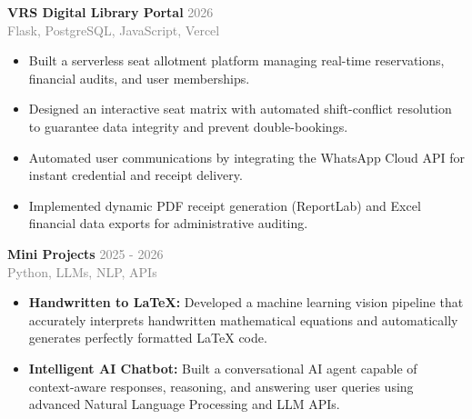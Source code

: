 \documentclass[a4paper,10pt]{article}
\begin{document}
\begin{minipage}[t]{12.2cm}
    \textbf{VRS Digital Library Portal} \hfill \textcolor{GrayText}{2026}\\
    \textcolor{GrayText}{Flask, PostgreSQL, JavaScript, Vercel}\\
    \begin{itemize}[leftmargin=*, noitemsep, topsep=0pt, label={\color{DarkText}\textbullet}]
        \color{LightText}\small
        \item Built a serverless seat allotment platform managing real-time reservations, financial audits, and user memberships.
        \item Designed an interactive seat matrix with automated shift-conflict resolution to guarantee data integrity and prevent double-bookings.
        \item Automated user communications by integrating the WhatsApp Cloud API for instant credential and receipt delivery.
        \item Implemented dynamic PDF receipt generation (ReportLab) and Excel financial data exports for administrative auditing. 
    \end{itemize}
    \vspace{0.3cm}

    \textbf{Mini Projects} \hfill \textcolor{GrayText}{2025 - 2026}\\
    \textcolor{GrayText}{Python, LLMs, NLP, APIs}\\
    \begin{itemize}[leftmargin=*, noitemsep, topsep=0pt, label={\color{DarkText}\textbullet}]
        \color{LightText}\small
        \item \textbf{Handwritten to LaTeX:} Developed a machine learning vision pipeline that accurately interprets handwritten mathematical equations and automatically generates perfectly formatted LaTeX code.
        \item \textbf{Intelligent AI Chatbot:} Built a conversational AI agent capable of context-aware responses, reasoning, and answering user queries using advanced Natural Language Processing and LLM APIs.
    \end{itemize}
    
\end{minipage}
\end{document}
